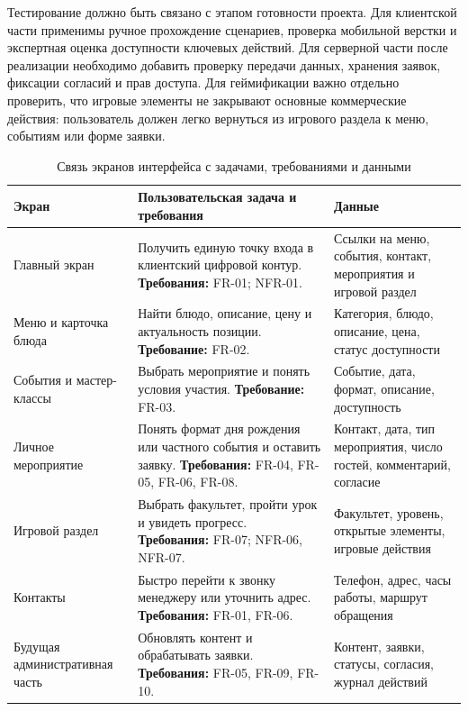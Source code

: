 Тестирование должно быть связано с этапом готовности проекта. Для клиентской части применимы ручное прохождение сценариев, проверка мобильной верстки и экспертная оценка доступности ключевых действий. Для серверной части после реализации необходимо добавить проверку передачи данных, хранения заявок, фиксации согласий и прав доступа. Для геймификации важно отдельно проверить, что игровые элементы не закрывают основные коммерческие действия: пользователь должен легко вернуться из игрового раздела к меню, событиям или форме заявки.

\begin{table}[H]
\centering
\small
\caption{Связь экранов интерфейса с задачами, требованиями и данными}
\label{tab:ch3_screens_requirements_data}
\begin{tabularx}{\textwidth}{|>{\raggedright\arraybackslash}p{}|>{\raggedright\arraybackslash}p{}|>{\raggedright\arraybackslash}X|}
\hline
\textbf{Экран} & \textbf{Пользовательская задача и требования} & \textbf{Данные} \\ \hline
Главный экран & Получить единую точку входа в клиентский цифровой контур. \newline \textbf{Требования:} FR-01; NFR-01. & Ссылки на меню, события, контакт, мероприятия и игровой раздел \\ \hline
Меню и карточка блюда & Найти блюдо, описание, цену и актуальность позиции. \newline \textbf{Требование:} FR-02. & Категория, блюдо, описание, цена, статус доступности \\ \hline
События и мастер-классы & Выбрать мероприятие и понять условия участия. \newline \textbf{Требование:} FR-03. & Событие, дата, формат, описание, доступность \\ \hline
Личное мероприятие & Понять формат дня рождения или частного события и оставить заявку. \newline \textbf{Требования:} FR-04, FR-05, FR-06, FR-08. & Контакт, дата, тип мероприятия, число гостей, комментарий, согласие \\ \hline
Игровой раздел & Выбрать факультет, пройти урок и увидеть прогресс. \newline \textbf{Требования:} FR-07; NFR-06, NFR-07. & Факультет, уровень, открытые элементы, игровые действия \\ \hline
Контакты & Быстро перейти к звонку менеджеру или уточнить адрес. \newline \textbf{Требования:} FR-01, FR-06. & Телефон, адрес, часы работы, маршрут обращения \\ \hline
Будущая административная часть & Обновлять контент и обрабатывать заявки. \newline \textbf{Требования:} FR-05, FR-09, FR-10. & Контент, заявки, статусы, согласия, журнал действий \\ \hline
\end{tabularx}
\normalsize
\end{table}

